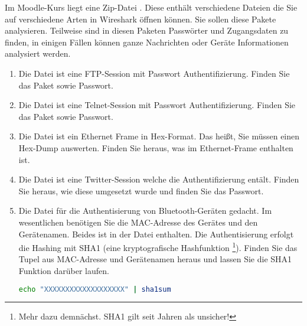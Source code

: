 \documentclass[paper=a4,fontsize=11pt]{scrartcl}%
\begin{document}
Im Moodle-Kurs liegt eine Zip-Datei . Diese enthält verschiedene Dateien die Sie auf verschiedene Arten in Wireshark öffnen können. Sie sollen diese Pakete analysieren. Teilweise sind in diesen Paketen Passwörter und Zugangsdaten zu finden, in einigen Fällen können ganze Nachrichten oder Geräte Informationen analysiert werden.
\begin{enumerate}
	\item Die Datei  ist eine FTP-Session mit Passwort Authentifizierung. Finden Sie das Paket sowie Passwort.
	\item Die Datei  ist eine Telnet-Session mit Passwort Authentifizierung. Finden Sie das Paket sowie Passwort.
	\item Die Datei  ist ein Ethernet Frame in Hex-Format. Das heißt, Sie müssen einen Hex-Dump auswerten. Finden Sie heraus, was im Ethernet-Frame enthalten ist.
	\item Die Datei  ist eine Twitter-Session welche die Authentifizierung entält. Finden Sie heraus, wie diese umgesetzt wurde und finden Sie das Passwort.
	\item Die Datei  für die Authentisierung von Bluetooth-Geräten gedacht. Im wesentlichen benötigen Sie die MAC-Adresse des Gerätes und den Gerätenamen. Beides ist in der Datei enthalten. Die Authentisierung erfolgt die Hashing mit SHA1 (eine kryptografische Hashfunktion \footnote{Mehr dazu demnächst. SHA1 gilt seit Jahren als unsicher!}). Finden Sie das Tupel aus MAC-Adresse und Gerätenamen heraus und lassen Sie die SHA1 Funktion darüber laufen.
	\begin{lstlisting}[style=Bash, language=Bash]
echo "XXXXXXXXXXXXXXXXXXX" | sha1sum
\end{lstlisting}
\end{enumerate}
\end{document}
